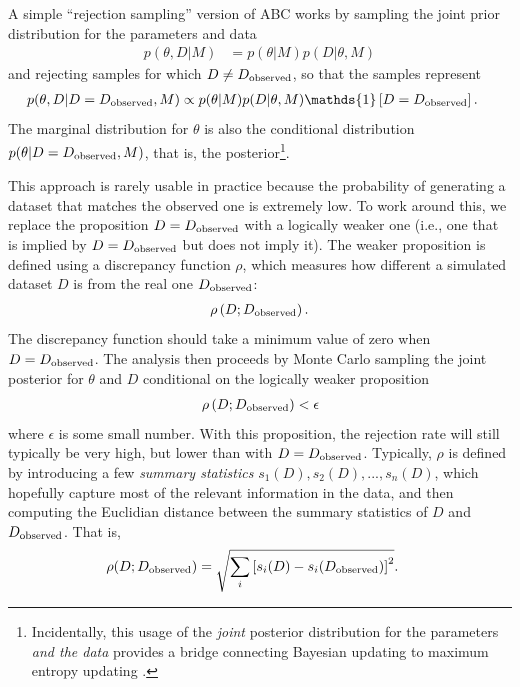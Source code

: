 \documentclass[article, nojss]{jss}
\begin{document}
A simple ``rejection sampling'' version of
ABC works by sampling the joint prior distribution for the parameters and
data
\begin{align}
p(\theta, D | M) &= p(\theta | M)p(D | \theta, M)
\end{align}
and rejecting samples for which $D \neq D_{\rm observed}$, so that the
samples represent
\begin{align}
p(\theta, D | D = D_{\rm observed}, M) &\propto p(\theta | M)p(D | \theta, M)
\mathds{1}\left[D = D_{\rm observed}\right].\label{eqn:abc_posterior}
\end{align}
The marginal distribution for $\theta$ is also the conditional distribution
$p(\theta | D = D_{\rm observed}, M)$, that is,
the posterior\footnote{Incidentally, this usage of the {\em joint} posterior
distribution for the parameters {\em and the data} provides a bridge
connecting Bayesian updating to maximum entropy updating
\citep{caticha2006updating,giffin2007updating}.}.

This approach is rarely usable in practice because the probability of
generating a dataset that matches the observed one is extremely low.
To work around this, we replace the proposition
$D = D_{\rm observed}$ with a logically
weaker one (i.e., one that is implied by $D = D_{\rm observed}$ but does not
imply it).
The weaker proposition is defined using
a discrepancy function
$\rho$, which measures how different a simulated dataset $D$ is from
the real one $D_{\rm observed}$:
\begin{align}
\rho\left(D; D_{\rm observed}\right).
\end{align}
The discrepancy function should take a minimum value of zero when
$D = D_{\rm observed}$.
The analysis then proceeds by Monte Carlo sampling the
joint posterior for $\theta$ and $D$
conditional on the logically weaker proposition
\begin{align}
\rho\left(D; D_{\rm observed}\right) < \epsilon
\end{align}
where $\epsilon$ is some small number. With this proposition, the
rejection rate will still
typically be very high, but lower than with $D = D_{\rm observed}$.
Typically, $\rho$ is defined by introducing a few {\em summary statistics}
$s_1(D), s_2(D), ..., s_n(D)$, which hopefully capture most of the relevant
information in the data, and then computing the Euclidian distance
between the summary statistics of $D$ and $D_{\rm observed}$.
That is,
\begin{align}
\rho(D; D_{\rm observed}) &=
\sqrt{\sum_i \left[s_i(D) - s_i(D_{\rm observed})\right]^2}.
\end{align}
\end{document}
